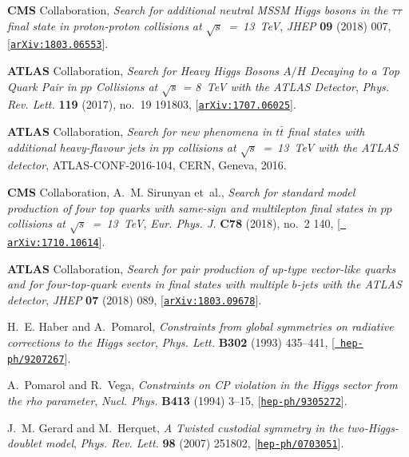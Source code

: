 \documentclass[a4paper, 11pt,notoc]{article}
\begin{document}
\begin{thebibliography}{100}
{\bf CMS} Collaboration, {\it {Search for additional
  neutral MSSM Higgs bosons in the $\tau\tau$ final state in proton-proton
  collisions at $\sqrt{s}$~=~13~TeV}},  {\em JHEP} {\bf 09} (2018) 007,
  [\href{http://arxiv.org/abs/1803.06553}{{\tt arXiv:1803.06553}}].

{\bf ATLAS} Collaboration, {\it {Search for Heavy Higgs
  Bosons $A/H$ Decaying to a Top Quark Pair in $pp$ Collisions at
  $\sqrt{s}$ = 8~TeV with the ATLAS Detector}},  {\em
  Phys. Rev. Lett.} {\bf 119} (2017), no.~19 191803,
  [\href{http://arxiv.org/abs/1707.06025}{{\tt arXiv:1707.06025}}].
  
{\bf ATLAS} Collaboration, {\it {Search for new phenomena in $t\bar{t}$ final
  states with additional heavy-flavour jets in $pp$ collisions at $\sqrt{s}$~=~13~TeV with the ATLAS detector}},  
  ATLAS-CONF-2016-104, CERN, Geneva, 2016.  

{\bf CMS} Collaboration, A.~M. Sirunyan et~al., {\it {Search for standard model
  production of four top quarks with same-sign and multilepton final states in
  $pp$ collisions at $\sqrt{s}$~=~13~TeV}},  {\em Eur. Phys. J.} {\bf
  C78} (2018), no.~2 140, [\href{http://arxiv.org/abs/1710.10614}{{\tt
  arXiv:1710.10614}}].

{\bf ATLAS} Collaboration, {\it {Search for pair production
  of up-type vector-like quarks and for four-top-quark events in final states
  with multiple $b$-jets with the ATLAS detector}},  {\em JHEP} {\bf 07} (2018)
  089, [\href{http://arxiv.org/abs/1803.09678}{{\tt arXiv:1803.09678}}].

H.~E. Haber and A.~Pomarol, {\it {Constraints from global symmetries on
  radiative corrections to the Higgs sector}},  {\em Phys. Lett.} {\bf B302}
  (1993) 435--441, [\href{http://arxiv.org/abs/hep-ph/9207267}{{\tt
  hep-ph/9207267}}].

A.~Pomarol and R.~Vega, {\it {Constraints on CP violation in the Higgs sector
  from the rho parameter}},  {\em Nucl. Phys.} {\bf B413} (1994) 3--15,
  [\href{http://arxiv.org/abs/hep-ph/9305272}{{\tt hep-ph/9305272}}].

J.~M. Gerard and M.~Herquet, {\it {A Twisted custodial symmetry in the
  two-Higgs-doublet model}},  {\em Phys. Rev. Lett.} {\bf 98} (2007) 251802,
  [\href{http://arxiv.org/abs/hep-ph/0703051}{{\tt hep-ph/0703051}}].


\end{thebibliography}
\end{document}

